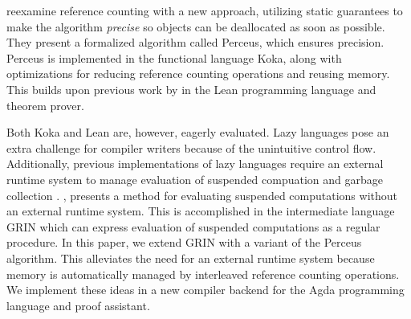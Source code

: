 \documentclass[9pt, twocolumn]{article}
\begin{document}
\citet{reinking2021} reexamine reference counting with a new approach, utilizing static guarantees to make the algorithm \emph{precise} so objects can be deallocated as soon as possible.
They present a formalized algorithm called Perceus, which ensures precision. 
Perceus is implemented in the functional language Koka, along with optimizations for reducing reference counting operations and reusing memory.
This builds upon previous work by \citet{ullrich2021} in the Lean programming language and theorem prover. 


Both Koka and Lean are, however, eagerly evaluated. 
Lazy languages pose an extra challenge for compiler writers because of the unintuitive control flow. 
Additionally, previous implementations of lazy languages require an external runtime system to manage evaluation of suspended compuation and garbage collection \citep{johnsson1984, augustsson1984, jones1992, turner1979}.
\citet{johnsson1991}, presents a method for evaluating suspended computations without an external runtime system.
This is accomplished in the intermediate language GRIN which can express evaluation of suspended computations as a regular procedure.
In this paper, we extend GRIN with a variant of the Perceus algorithm.
This alleviates the need for an external runtime system because memory is automatically managed by interleaved reference counting operations. 
We implement these ideas in a new compiler backend for the Agda programming language and proof assistant. 


\end{document}
